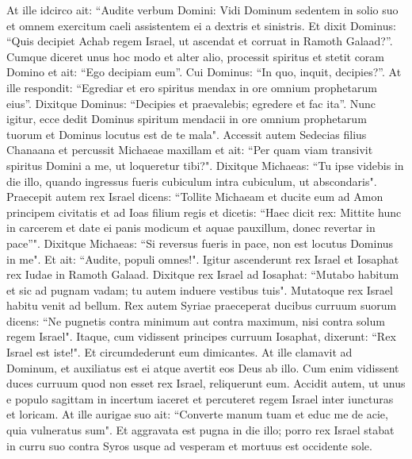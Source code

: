\begin{biblechapter}
\verse At ille idcirco ait: “Audite verbum Domini: Vidi Dominum sedentem in solio suo et omnem exercitum caeli assistentem ei a dextris et sinistris. 
\verse Et dixit Dominus: “Quis decipiet Achab regem Israel, ut ascendat et corruat in Ramoth Galaad?”. Cumque diceret unus hoc modo et alter alio, 
\verse processit spiritus et stetit coram Domino et ait: “Ego decipiam eum”. Cui Dominus: “In quo, inquit, decipies?”. 
\verse At ille respondit: “Egrediar et ero spiritus mendax in ore omnium prophetarum eius”. Dixitque Dominus: “Decipies et praevalebis; egredere et fac ita”. 
\verse Nunc igitur, ecce dedit Dominus spiritum mendacii in ore omnium prophetarum tuorum et Dominus locutus est de te mala". 
\verse Accessit autem Sedecias filius Chanaana et percussit Michaeae maxillam et ait: “Per quam viam transivit spiritus Domini a me, ut loqueretur tibi?". 
\verse Dixitque Michaeas: “Tu ipse videbis in die illo, quando ingressus fueris cubiculum intra cubiculum, ut abscondaris". 
\verse Praecepit autem rex Israel dicens: “Tollite Michaeam et ducite eum ad Amon principem civitatis et ad Ioas filium regis 
\verse et dicetis: “Haec dicit rex: Mittite hunc in carcerem et date ei panis modicum et aquae pauxillum, donec revertar in pace”". 
\verse Dixitque Michaeas: “Si reversus fueris in pace, non est locutus Dominus in me". Et ait: “Audite, populi omnes!". 
\verse Igitur ascenderunt rex Israel et Iosaphat rex Iudae in Ramoth Galaad. 
\verse Dixitque rex Israel ad Iosaphat: “Mutabo habitum et sic ad pugnam vadam; tu autem induere vestibus tuis". Mutatoque rex Israel habitu venit ad bellum. 
\verse Rex autem Syriae praeceperat ducibus curruum suorum dicens: “Ne pugnetis contra minimum aut contra maximum, nisi contra solum regem Israel". 
\verse Itaque, cum vidissent principes curruum Iosaphat, dixerunt: “Rex Israel est iste!". Et circumdederunt eum dimicantes. At ille clamavit ad Dominum, et auxiliatus est ei atque avertit eos Deus ab illo. 
\verse Cum enim vidissent duces curruum quod non esset rex Israel, reliquerunt eum. 
\verse Accidit autem, ut unus e populo sagittam in incertum iaceret et percuteret regem Israel inter iuncturas et loricam. At ille aurigae suo ait: “Converte manum tuam et educ me de acie, quia vulneratus sum". 
\verse Et aggravata est pugna in die illo; porro rex Israel stabat in curru suo contra Syros usque ad vesperam et mortuus est occidente sole. 
\end{biblechapter}

